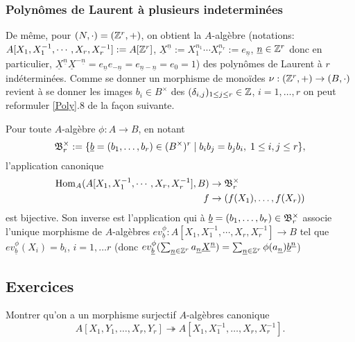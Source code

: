 \subsubsection{Polynômes de Laurent à plusieurs indeterminées}
  
De même, pour $(N,\cdot)=(\mathbb{Z}^r,+)$, on obtient la $A$-algèbre (notations:
$A[X_1,X_1^{-1},\cdots, X_r,X_r^{-1}]:=A[\mathbb{Z}^r]$,
$\underline{X}^{\underline{n}}:=X_1^{n_1}\cdots X_r^{n_r}:=e_{\underline{n}}$,
$\underline{n}\in \mathbb{Z}^r$ donc en particulier,
$\underline{X}^{\underline{n}}\underline{X}^{-\underline{n}}=
e_{\underline{n}}e_{-\underline{n}}=e_{\underline{n}-\underline{n}}=e_0=1$) des
polynômes de Laurent à $r$ indéterminées. Comme se donner    un morphisme de
monoïdes $\nu:(\mathbb{Z}^r,+)\rightarrow (B ,\cdot)$ revient à se donner les images
$b_i \in B^\times $ des $(\delta_{i,j})_{1\leq j\leq r}\in \mathbb{Z}$, $i=1,\dots, r$
on peut reformuler \ref{Poly}.8 de la façon suivante.

\begin{definition}
    Pour toute $A$-algèbre $\phi:A\rightarrow B$, en notant
 $$\frak{B}^\times_r:= \lbrace \underline{b}=(b_1,\dots, b_r)\in (B^\times)^r\;|\; b_ib_j=b_jb_i,\; 1\leq i,j\leq r\rbrace,$$  l'application canonique
    \begin{align*}
        \operatorname{Hom}_A(A[X_1,X_1^{-1},\cdots, X_r,X_r^{-1}],B) &\to \frak{B}_r^\times \\
        f&\to (f(X_1),\dots, f(X_r))
    \end{align*}
    est bijective. Son inverse est l'application qui à
    $\underline{b}=(b_1,\dots, b_r)\in \frak{B}^\times_r$ associe l'unique
    morphisme de $A$-algèbres $ev_{\underline{b}}^\phi:A[X_1,X_1^{-1},\cdots,
    X_r,X_r^{-1}]\rightarrow B$ tel que $ev_{\underline{b}}^\phi(X_i)=b_i$,
    $i=1,\dots r$ (donc $ev_{\underline{b}}^\phi(\sum_{\underline{n}\in
    \mathbb{Z}^r}a_{\underline{n}}\underline{X}^{\underline{n}})=\sum_{\underline{n}\in
    \mathbb{Z}^r}\phi(a_{\underline{n}})\underline{b}^{\underline{n}}$)
\end{definition}

\subsection{Exercices}

\begin{exercice}
    Montrer qu'on a un morphisme surjectif $A$-algèbres canonique
    $$A[X_1,Y_1,\dots, X_r,Y_r]\twoheadrightarrow A[X_1,X_1^{-1},\dots,X_r,
    X_r^{-1}].$$
\end{exercice}

